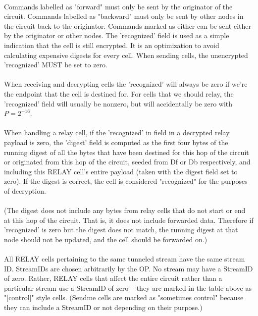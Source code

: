 \paragraph{}
Commands labelled as "forward" must only be sent by the originator
of the circuit. Commands labelled as "backward" must only be sent by
other nodes in the circuit back to the originator. Commands marked
as either can be sent either by the originator or other nodes.
The 'recognized' field is used as a simple indication that the cell
is still encrypted. It is an optimization to avoid calculating
expensive digests for every cell. When sending cells, the unencrypted
'recognized' MUST be set to zero.

\paragraph{}
When receiving and decrypting cells the 'recognized' will always be
zero if we're the endpoint that the cell is destined for. For cells
that we should relay, the 'recognized' field will usually be nonzero,
but will accidentally be zero with $P=2^{-16}$.

\paragraph{}
When handling a relay cell, if the 'recognized' in field in a
decrypted relay payload is zero, the 'digest' field is computed as
the first four bytes of the running digest of all the bytes that have
been destined for this hop of the circuit or originated from this hop
of the circuit, seeded from Df or Db respectively, and including this
RELAY cell's entire payload (taken with the digest field set to zero).
If the digest is correct, the cell is considered "recognized" for the
purposes of decryption.

\paragraph{}
(The digest does not include any bytes from relay cells that do
not start or end at this hop of the circuit. That is, it does not
include forwarded data. Therefore if 'recognized' is zero but the
digest does not match, the running digest at that node should
not be updated, and the cell should be forwarded on.)

\paragraph{}
All RELAY cells pertaining to the same tunneled stream have the same
stream ID. StreamIDs are chosen arbitrarily by the OP. No stream
may have a StreamID of zero. Rather, RELAY cells that affect the
entire circuit rather than a particular stream use a StreamID of zero
-- they are marked in the table above as "[control]" style
cells. (Sendme cells are marked as "sometimes control" because they
can include a StreamID or not depending on their purpose.)

